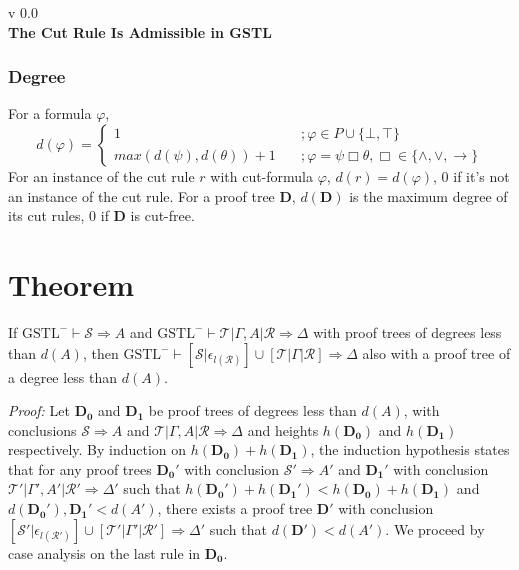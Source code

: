 \documentclass[a4paper, 12pt]{paper}
\begin{document}
{\noindent
	v 0.0 \\
{\large\textbf{The Cut Rule Is Admissible in GSTL}}
}
\\


\subsubsection{Degree} For a formula $\varphi$,
\[ d(\varphi) = \begin{cases}
	1 & \quad ; \varphi \in P \cup \{ \bot, \top \} \\
	max(d(\psi), d(\theta)) + 1 & \quad ; \varphi = \psi \Box \theta, \Box \in \{ \land , \lor, \rightarrow \}
\end{cases} \]
For an instance of the cut rule $r$ with cut-formula $\varphi$, $d(r) = d(\varphi)$, $0$ if it's not an instance of the cut rule.
For a proof tree $\mathbf{D}$, $d(\mathbf{D})$ is the maximum degree of its cut rules, $0$ if $\mathbf{D}$ is cut-free.
\pagebreak

\section{Theorem}\label{cut-admis} If $\text{GSTL}^-\vdash \mathcal{S} \Rightarrow A$ and $\text{GSTL}^-\vdash \mathcal{T} | \Gamma, A | \mathcal{R} \Rightarrow \Delta$ with proof trees of degrees less than $d(A)$, then
 $\text{GSTL}^-\vdash [ \mathcal{S} | \epsilon_{l(\mathcal{R})} ] \cup [ \mathcal{T} | \Gamma | \mathcal{R} ] \Rightarrow \Delta$ also with a proof tree of a degree less than $d(A)$.
 
\emph{Proof:}
Let $\mathbf{D_0}$ and $\mathbf{D_1}$ be proof trees of degrees less than $d(A)$, with conclusions $\mathcal{S} \Rightarrow A$ and $\mathcal{T} | \Gamma, A | \mathcal{R} \Rightarrow \Delta$ and heights $h(\mathbf{D_0})$ and $h(\mathbf{D_1})$ respectively. By induction on $h(\mathbf{D_0}) + h(\mathbf{D_1})$, the induction hypothesis states that for any proof trees $\mathbf{D_0}'$ with conclusion $\mathcal{S}' \Rightarrow A'$ and $\mathbf{D_1}'$ with conclusion $\mathcal{T}' | \Gamma', A' | \mathcal{R}' \Rightarrow \Delta'$ such that $h(\mathbf{D_0}') + h(\mathbf{D_1}') < h(\mathbf{D_0}) + h(\mathbf{D_1})$ and $d(\mathbf{D_0}'),\mathbf{D_1}' < d(A')$, there exists a proof tree $\mathbf{D}'$ with conclusion $[ \mathcal{S}' | \epsilon_{l(\mathcal{R}')} ] \cup [ \mathcal{T}' | \Gamma' | \mathcal{R}' ] \Rightarrow \Delta'$ such that $d(\mathbf{D}') < d(A')$. We proceed by case analysis on the last rule in $\mathbf{D_0}$.
\end{document}
